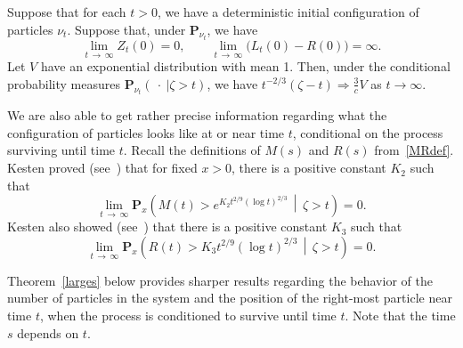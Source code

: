 \documentclass[10pt]{amsart}
\theoremstyle{definition}\newtheorem{defi}[theo]{Definition}\newtheorem{rema}[theo]{Remark}\newtheorem{exam}[theo]{Example}\newtheorem{exem}[theo]{Example}\newtheorem{nota}[theo]{Notation}
\renewcommand*\P{\mathbf{P}}
\newcommand{\1} {\mathds{1}}
\begin{document}
\begin{prop}\label{extinctiondist}
Suppose that for each $t > 0$, we have a deterministic initial configuration of particles $\nu_t$. Suppose that, under $\P_{\nu_t}$, we have
\begin{equation}\label{maininitial}
\lim_{t\,\rightarrow\,\infty} Z_t(0) = 0, \qquad\lim_{t\,\rightarrow\,\infty} \big(L_t(0) - R(0)\big) = \infty.
\end{equation}
Let $V$ have an exponential distribution with mean 1. Then, under the conditional probability measures $\P_{\nu_t}(\: \cdot \:| \zeta > t)$, we have $t^{-2/3}(\zeta - t) \Rightarrow \frac{3}{c} V$ as $t \rightarrow \infty$.
\end{prop}

We are also able to get rather precise information regarding what the configuration of particles looks like at or near time $t$, conditional on the process surviving until time $t$. Recall the definitions of $M(s)$ and $R(s)$ from~\eqref{MRdef}. Kesten proved (see~\cite[(1.12)]{kesten}) that for fixed $x > 0$, there is a positive constant $K_2$ such that
\begin{equation}\label{KestenM}
\lim_{t\,\rightarrow\,\infty} \P_x\left(M(t) > e^{K_2 t^{2/9} (\log t)^{2/3}} \, \middle| \, \zeta > t\right) = 0.
\end{equation}
Kesten also showed (see~\cite[(1.11)]{kesten}) that there is a positive constant $K_3$ such that
\begin{equation}\label{KestenR}
\lim_{t\,\rightarrow\,\infty} \P_x\left(R(t) > K_3 t^{2/9} (\log t)^{2/3} \,\middle| \, \zeta > t\right) = 0.
\end{equation}

Theorem~\ref{larges} below provides sharper results regarding the behavior of the number of particles in the system and the position of the right-most particle near time $t$, when the process is conditioned to survive until time $t$. Note that the time $s$ depends on $t$.
\end{document}
